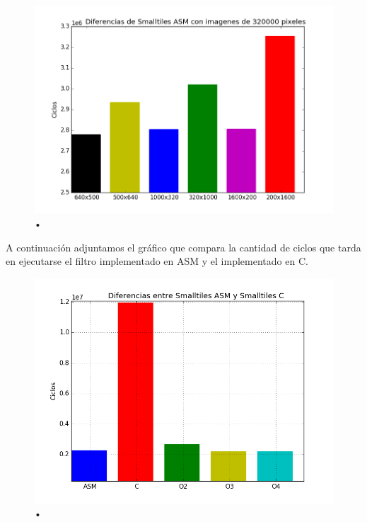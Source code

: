 \begin{figure}[h!]
\includegraphics[width = 15 cm, height = 10 cm]{imagenes/distintostamanos.png}
\caption{•}
\end{figure}
	
	A continuación adjuntamos el gráfico que compara la cantidad de ciclos que tarda en ejecutarse el filtro implementado en ASM y el implementado en C.
	\begin{figure}[h!]
\includegraphics[width = 15 cm, height = 10 cm]{imagenes/ASMvsC.png}
\caption{•}
\end{figure}
	